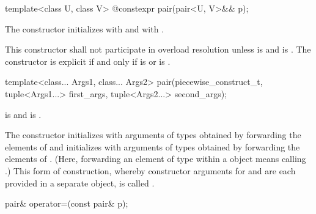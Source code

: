 \begin{itemdecl}
template<class U, class V> @\EXPLICIT@ constexpr pair(pair<U, V>&& p);
\end{itemdecl}

\begin{itemdescr}
\pnum
\effects
The constructor initializes  with
and  with
.

\pnum
\remarks This constructor shall not participate in overload resolution unless
 is  and
 is .
The constructor is explicit if and only if
 is  or
 is .
\end{itemdescr}

\begin{itemdecl}
template<class... Args1, class... Args2>
  pair(piecewise_construct_t,
       tuple<Args1...> first_args, tuple<Args2...> second_args);
\end{itemdecl}

\begin{itemdescr}
\pnum
\requires {} is 
and  is .

\pnum
\effects The constructor initializes  with arguments of types
 obtained by forwarding the elements of 
and initializes  with arguments of types 
obtained by forwarding the elements of . (Here, forwarding
an element  of type  within a  object means calling
.) This form of construction, whereby constructor
arguments for  and  are each provided in a separate
 object, is called .
\end{itemdescr}

\begin{itemdecl}
pair& operator=(const pair& p);
\end{itemdecl}

